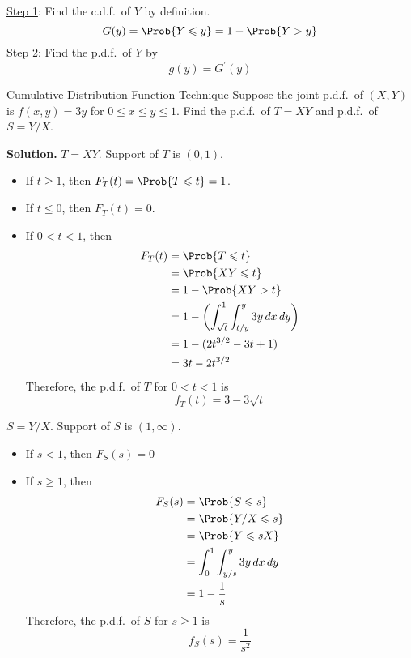 \underline{Step 1}: Find the c.d.f.\ of $ Y $ by definition.
\[ G(y)=\Prob{Y\leqslant y}=1-\Prob{Y>y} \]
\underline{Step 2}: Find the p.d.f.\ of $ Y $ by
\[ g(y)=G^\prime(y) \]
\begin{Example}{Cumulative Distribution Function Technique}{}
    Suppose the joint p.d.f.\ of $ (X,Y) $ is $ f(x,y)=3y $
    for $ 0\leqslant x\leqslant y\leqslant 1 $. Find the p.d.f.\
    of $ T=XY $ and p.d.f.\ of $ S=Y/X $.

    \textbf{Solution.} $ T=XY $. Support of $ T $ is $ (0,1) $.
    \begin{itemize}
        \item If $ t\geqslant 1 $, then $ F_T(t)=\Prob{T\leqslant t}=1 $.
        \item If $ t\leqslant 0 $, then $ F_T(t)=0 $.
        \item If $ 0<t<1 $, then
              \begin{align*}
                  F_T(t)
                   & =\Prob{T\leqslant t}                                                   \\
                   & =\Prob{XY\leqslant t}                                                  \\
                   & =1-\Prob{XY>t}                                                         \\
                   & =1-\biggl(\int_{\sqrt{t}}^{1} \int_{t/y}^{y} 3y\, d{x} \, d{y} \biggr) \\
                   & =1-(2t^{3/2}-3t+1)                                                     \\
                   & =3t-2t^{3/2}
              \end{align*}
              Therefore, the p.d.f.\ of $ T $ for $ 0<t<1 $ is
              \[ f_T(t)=3-3\sqrt{t} \]
    \end{itemize}
    $ S=Y/X $. Support of $ S $ is $ (1,\infty) $.
    \begin{itemize}
        \item If $ s<1 $, then $ F_S(s)=0 $
        \item If $ s\geqslant 1 $, then
              \begin{align*}
                  F_S(s)
                   & =\Prob{S\leqslant s}                           \\
                   & =\Prob{Y/X\leqslant s}                         \\
                   & =\Prob{Y\leqslant sX}                          \\
                   & =\int_{0}^{1} \int_{y/s}^{y} 3y\, d{x} \, d{y} \\
                   & =1-\frac{1}{s}
              \end{align*}
              Therefore, the p.d.f.\ of $ S $ for $ s\geqslant 1 $ is
              \[ f_S(s)=\frac{1}{s^2} \]
    \end{itemize}
\end{Example}
